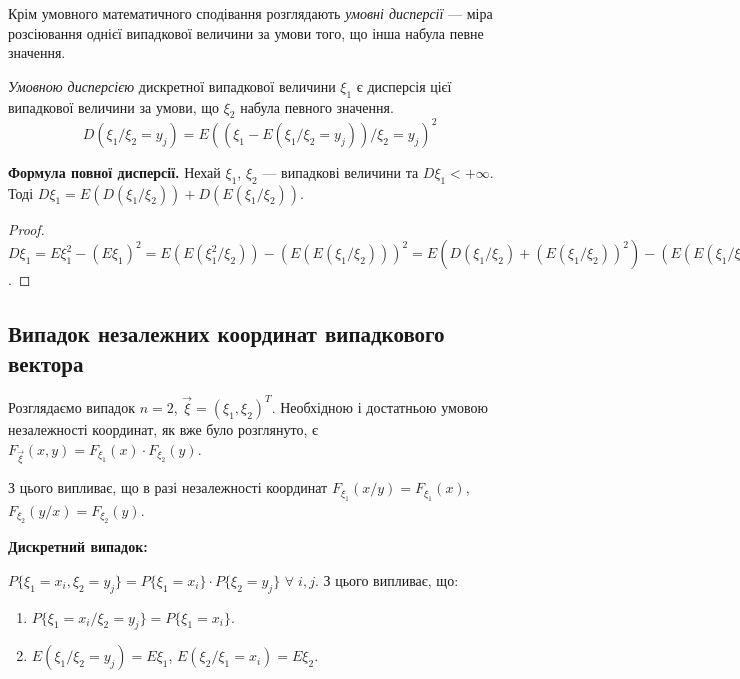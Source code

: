 Крім умовного математичного сподівання розглядають
\emph{умовні дисперсії} --- міра розсіювання однієї випадкової величини 
за умови того, що інша набула певне значення.

\begin{definition}
    \emph{Умовною дисперсією} дискретної випадкової величини $\xi_1$ 
    є дисперсія цієї випадкової величини за умови, що 
    $\xi_2$ набула певного значення.
    $$D(\xi_1 / \xi_2 = y_j) = 
    E((\xi_1 - E(\xi_1 / \xi_2 = y_j))/\xi_2 = y_j)^2$$
\end{definition}

\noindent\textbf{Формула повної дисперсії.}
    Нехай $\xi_1$, $\xi_2$ --- випадкові величини та $D\xi_1 < +\infty$. 
    Тоді
    $D\xi_1 = E(D(\xi_1/\xi_2)) + D(E(\xi_1 / \xi_2))$.

\begin{proof}
    $D\xi_1 = E\xi_1^2 - (E \xi_1)^2 = 
    E(E(\xi_1^2 / \xi_2)) - (E(E(\xi_1/\xi_2)))^2 = 
    E(D(\xi_1/\xi_2) + (E(\xi_1/\xi_2))^2) - (E(E(\xi_1/\xi_2)))^2 = 
    E(D(\xi_1 / \xi_2)) + (E(E(\xi_1/\xi_2)^2) - 
    (E(E(\xi_1 / \xi_2)))^2) = E(D(\xi_1/\xi_2)) + D(E(\xi_1/\xi_2))$.
\end{proof}



\subsection{Випадок незалежних координат випадкового вектора}

Розглядаємо випадок $n=2$, $\vec{\xi} = \left(\xi_1, \xi_2\right)^T$.
Необхідною і достатньою умовою незалежності координат, як вже було розглянуто, є 
$F_{\vec{\xi}}(x, y) = F_{\xi_1}(x)\cdot F_{\xi_2}(y)$.

З цього випливає, що в разі незалежності координат $F_{\xi_1}(x/y) = F_{\xi_1}(x)$, 
$F_{\xi_2}(y/x) = F_{\xi_2}(y)$.

\noindent\textbf{Дискретний випадок: }

$P\{\xi_1 = x_i, \xi_2 = y_j\} = P\{\xi_1 = x_i\}\cdot P\{\xi_2 = y_j\}$ 
$\forall \; i,j$.
З цього випливає, що:

\begin{enumerate}
    \item $P\{\xi_1 = x_i / \xi_2 = y_j\} = 
    P\{\xi_1 = x_i\}$.
    \item $E(\xi_1 / \xi_2 = y_j) = E\xi_1$,
    $E(\xi_2 / \xi_1 = x_i) = E\xi_2$.
\end{enumerate}

